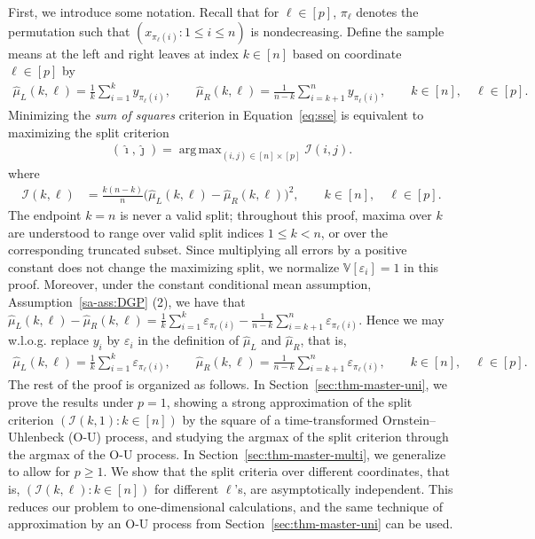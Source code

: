 \documentclass[10pt]{article}
\DeclareMathOperator*{\argmax}{arg\,max}
\def\V{\mathbb{V}}
\def\I{\mathscr{I}}
\theoremstyle{definition}
\theoremstyle{remark}
\begin{document}
First, we introduce some notation. Recall that for $\ell \in [p]$, $\pi_\ell$ denotes the permutation such that $(x_{\pi_\ell(i)}: 1 \leq i \leq n)$ is nondecreasing. Define the sample means at the left and right leaves at index $k \in [n]$ based on coordinate $\ell \in [p]$ by
\begin{align*}
    \hat\mu_{L}(k,\ell) = \frac{1}{k} \sum_{i = 1}^k y_{\pi_{\ell}(i)}, \qquad \hat \mu_{R}(k, \ell) = \frac{1}{n - k} \sum_{i = k+1}^n y_{\pi_{\ell}(i)}, \qquad k \in [n], \quad \ell \in [p].
\end{align*}
Minimizing the \emph{sum of squares} criterion in Equation~\eqref{eq:sse} is equivalent to maximizing the split criterion
\begin{align*}
    (\hat{\imath}, \hat{\jmath}) = \argmax_{(i,j) \in [n] \times [p]} \I(i,j).
\end{align*}
where
\begin{align*}
    \I(k,\ell) & = \frac{k(n-k)}{n}\Big(\hat\mu_{L}(k,\ell)-\hat\mu_{R}(k,\ell)\Big)^2, \qquad k \in [n], \quad \ell \in [p].
\end{align*}
The endpoint $k=n$ is never a valid split; throughout this proof, maxima over $k$ are understood to range over valid split indices $1\leq k<n$, or over the corresponding truncated subset. Since multiplying all errors by a positive constant does not change the maximizing split, we normalize $\V[\varepsilon_i]=1$ in this proof.
Moreover, under the constant conditional mean assumption, Assumption~\ref{sa-ass:DGP} (2), we have that $\hat\mu_{L}(k,\ell) - \hat \mu_{R}(k, \ell) = \frac{1}{k} \sum_{i = 1}^k \varepsilon_{\pi_{\ell}(i)} - \frac{1}{n - k} \sum_{i = k+1}^n \varepsilon_{\pi_{\ell}(i)}$. Hence we may w.l.o.g. replace $y_i$ by $\varepsilon_i$ in the definition of $\hat \mu_L$ and $\hat \mu_R$, that is,
\begin{align*}
    \hat\mu_{L}(k,\ell) = \frac{1}{k} \sum_{i = 1}^k \varepsilon_{\pi_{\ell}(i)}, \qquad \hat \mu_{R}(k, \ell) = \frac{1}{n - k} \sum_{i = k+1}^n \varepsilon_{\pi_{\ell}(i)}, \qquad k \in [n], \quad \ell \in [p].
\end{align*}
The rest of the proof is organized as follows. In Section~\ref{sec:thm-master-uni}, we prove the results under $p = 1$, showing a strong approximation of the split criterion $(\I(k,1): k \in [n])$ by the square of a time-transformed Ornstein--Uhlenbeck (O-U) process, and studying the argmax of the split criterion through the argmax of the O-U process. In Section~\ref{sec:thm-master-multi}, we generalize to allow for $p \geq 1$. We show that the split criteria over different coordinates, that is, $(\I(k,\ell): k \in [n])$ for different $\ell$'s, are asymptotically independent. This reduces our problem to one-dimensional calculations, and the same technique of approximation by an O-U process from Section~\ref{sec:thm-master-uni} can be used.
\end{document}
